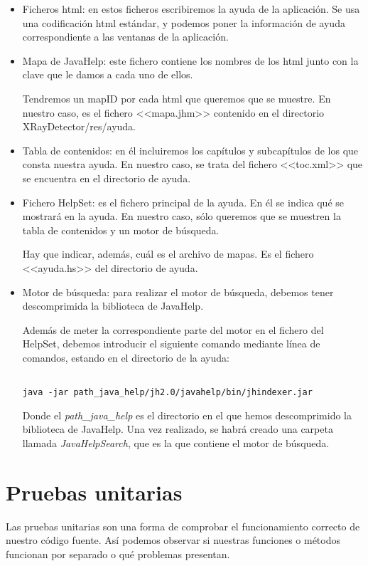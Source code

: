 \begin{itemize}
\item Ficheros html: en estos ficheros escribiremos la ayuda de la aplicación. Se usa una codificación html estándar, y podemos poner la información de ayuda correspondiente a las ventanas de la aplicación.
\item Mapa de JavaHelp: este fichero contiene los nombres de los html junto con la clave que le damos a cada uno de ellos.

Tendremos un mapID por cada html que queremos que se muestre. En nuestro caso, es el fichero <<mapa.jhm>> contenido en el directorio XRayDetector/res/ayuda.
\item Tabla de contenidos: en él incluiremos los capítulos y subcapítulos de los que consta nuestra ayuda. En nuestro caso, se trata del fichero <<toc.xml>> que se encuentra en el directorio de ayuda.
\item Fichero HelpSet: es el fichero principal de la ayuda. En él se indica qué se mostrará en la ayuda. En nuestro caso, sólo queremos que se muestren la tabla de contenidos y un motor de búsqueda.

Hay que indicar, además, cuál es el archivo de mapas. Es el fichero <<ayuda.hs>> del directorio de ayuda.
\item Motor de búsqueda: para realizar el motor de búsqueda, debemos tener descomprimida la biblioteca de JavaHelp.

Además de meter la correspondiente parte del motor en el fichero del HelpSet, debemos introducir el siguiente comando mediante línea de comandos, estando en el directorio de la ayuda:

\begin{verbatim}

java -jar path_java_help/jh2.0/javahelp/bin/jhindexer.jar

\end{verbatim}

Donde el \textit{path\_java\_help} es el directorio en el que hemos descomprimido la biblioteca de JavaHelp.
Una vez realizado, se habrá creado una carpeta llamada \textit{JavaHelpSearch}, que es la que contiene el motor de búsqueda.
\end{itemize}

\section{Pruebas unitarias}
Las pruebas unitarias son una forma de comprobar el funcionamiento correcto de nuestro código fuente. Así podemos observar si nuestras funciones o métodos funcionan por separado o qué problemas presentan.

